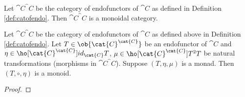 \begin{lemma}
    \label{lem:catofendoismonoidal}
    Let $\cat{C}^\cat{C}$ be the category of endofunctors of $\cat{C}$ as defined in Definition \ref{def:catofendo}. Then $\cat{C}^\cat{C}$ is a monoidal category.
\end{lemma}

\begin{example}
    \label{exe:catofsetsmonoidalwithmonoids}
    
\end{example}

\begin{lemma}
    \label{lem:monmon}
    Let $\cat{C}^\cat{C}$ be the category of endofunctors of $\cat{C}$ as defined above in Definition \ref{def:catofendo}. Let $T\in\ob{\cat{C}^\cat{C}}$ be an endofunctor of  $\cat{C}$ and $\eta\in\ho[\cat{C}^\cat{C}]{id_{\cat{C}}}{T}$, $\mu\in\ho[\cat{C}^\cat{C}]{T^2}{T}$ be natural transformations (morphisms in $\cat{C}^\cat{C}$). Suppose $(T,\eta,\mu)$ is a monad. Then $(T,\circ,\eta)$ is a monoid. 
\end{lemma}
\begin{proof}
    
\end{proof}